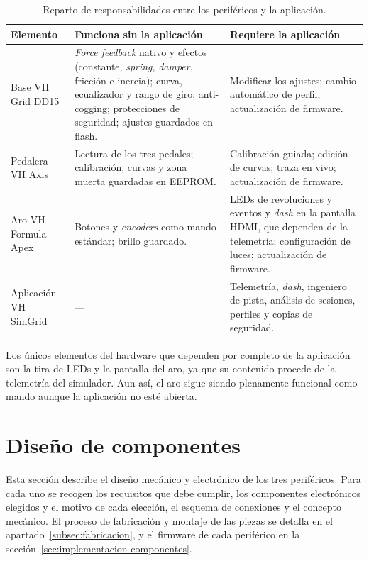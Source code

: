 \begin{table}[H]
	\centering
	\caption{Reparto de responsabilidades entre los periféricos y la aplicación.}
	\label{tab:reparto-responsabilidades}
	\small
	\begin{tabularx}{\textwidth}{@{}>{\raggedright\arraybackslash}p{2.8cm}>{\raggedright\arraybackslash}X>{\raggedright\arraybackslash}X@{}}
		\toprule
		\textbf{Elemento} & \textbf{Funciona sin la aplicación} & \textbf{Requiere la aplicación} \\
		\midrule
		Base VH Grid DD15 &
		\textit{Force feedback} nativo y efectos (constante, \emph{spring}, \emph{damper}, fricción e inercia); curva, ecualizador y rango de giro; anti-cogging; protecciones de seguridad; ajustes guardados en flash. &
		Modificar los ajustes; cambio automático de perfil; actualización de firmware. \\
		Pedalera VH Axis &
		Lectura de los tres pedales; calibración, curvas y zona muerta guardadas en EEPROM. &
		Calibración guiada; edición de curvas; traza en vivo; actualización de firmware. \\
		Aro VH Formula Apex &
		Botones y \textit{encoders} como mando estándar; brillo guardado. &
		LEDs de revoluciones y eventos y \textit{dash} en la pantalla HDMI, que dependen de la telemetría; configuración de luces; actualización de firmware. \\
		Aplicación VH SimGrid &
		--- &
		Telemetría, \textit{dash}, ingeniero de pista, análisis de sesiones, perfiles y copias de seguridad. \\
		\bottomrule
	\end{tabularx}
\end{table}

Los únicos elementos del hardware que dependen por completo de la aplicación son la tira de LEDs y la pantalla del aro, ya que su contenido procede de la telemetría del simulador. Aun así, el aro sigue siendo plenamente funcional como mando aunque la aplicación no esté abierta.

\section{Diseño de componentes}
\label{sec:diseno-componentes}
Esta sección describe el diseño mecánico y electrónico de los tres periféricos. Para cada uno se recogen los requisitos que debe cumplir, los componentes electrónicos elegidos y el motivo de cada elección, el esquema de conexiones y el concepto mecánico. El proceso de fabricación y montaje de las piezas se detalla en el apartado~\ref{subsec:fabricacion}, y el firmware de cada periférico en la sección~\ref{sec:implementacion-componentes}.

